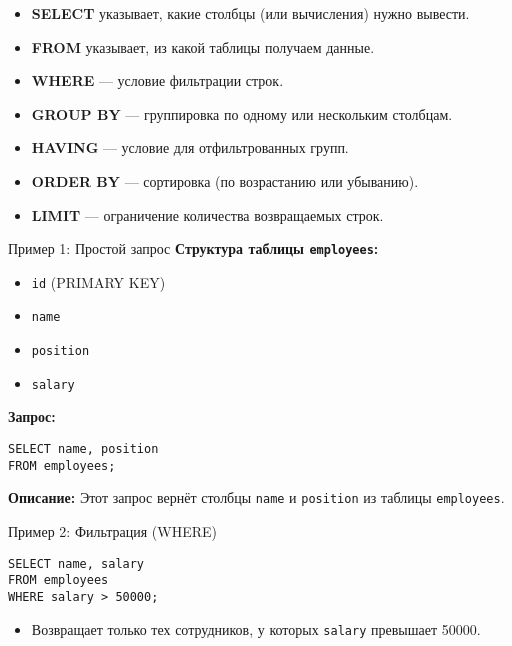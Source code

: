 \documentclass{beamer}
\begin{document}
\begin{frame}
	\begin{itemize}
		\item \textbf{SELECT} указывает, какие столбцы (или вычисления) нужно вывести.
		\item \textbf{FROM} указывает, из какой таблицы получаем данные.
		\item \textbf{WHERE} --- условие фильтрации строк.
		\item \textbf{GROUP BY} --- группировка по одному или нескольким столбцам.
		\item \textbf{HAVING} --- условие для отфильтрованных групп.
		\item \textbf{ORDER BY} --- сортировка (по возрастанию или убыванию).
		\item \textbf{LIMIT} --- ограничение количества возвращаемых строк.
	\end{itemize}
\end{frame}

\begin{frame}[fragile]{Пример 1: Простой запрос}
	\textbf{Структура таблицы \texttt{employees}:}
	\begin{itemize}
		\item \texttt{id} (PRIMARY KEY)
		\item \texttt{name}
		\item \texttt{position}
		\item \texttt{salary}
	\end{itemize}

	\textbf{Запрос:}
	\begin{verbatim}
SELECT name, position
FROM employees;
\end{verbatim}

	\textbf{Описание:}
	Этот запрос вернёт столбцы \texttt{name} и \texttt{position} из таблицы \texttt{employees}.
\end{frame}

\begin{frame}[fragile]{Пример 2: Фильтрация (WHERE)}
	\begin{verbatim}
SELECT name, salary
FROM employees
WHERE salary > 50000;
\end{verbatim}
	\begin{itemize}
		\item Возвращает только тех сотрудников, у которых \texttt{salary} превышает 50000.
	\end{itemize}
\end{frame}
\end{document}
